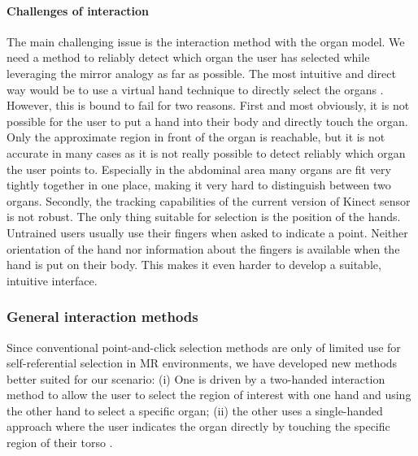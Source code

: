 \paragraph{Challenges of interaction}
The main challenging issue is the interaction method with the organ model. We need a method to reliably detect which organ the user has selected while leveraging the mirror analogy as far as possible. The most intuitive and direct way would be to use a virtual hand technique to directly select the organs \cite{Ha2010a}. However, this is bound to fail for two reasons.
First and most obviously, it is not possible for the user to put a hand into their body and directly touch the organ. Only the approximate region in front of the organ is reachable, but it is not accurate in many cases as it is not really possible to detect reliably which organ the user points to. 
Especially in the abdominal area many organs are fit very tightly together in one place, making it very hard to distinguish between two organs.
Secondly, the tracking capabilities of the current version of Kinect sensor is not robust. The only thing suitable for selection is the position of the hands. 
Untrained users usually use their fingers when asked to indicate a point.
Neither orientation of the hand nor information about the fingers is available when the hand is put on their body. 
This makes it even harder to develop a suitable, intuitive interface. 

\subsubsection{General interaction methods}
Since conventional point-and-click selection methods are only of limited use for self-referential selection in MR environments, we have developed new methods better suited for our scenario: (i) One is driven by a two-handed interaction method to allow the user to select the region of interest with one hand and using the other hand to select a specific organ; (ii) the other uses a single-handed approach where the user indicates the organ directly by touching the specific region of their torso \cite{weiss2013}. 

